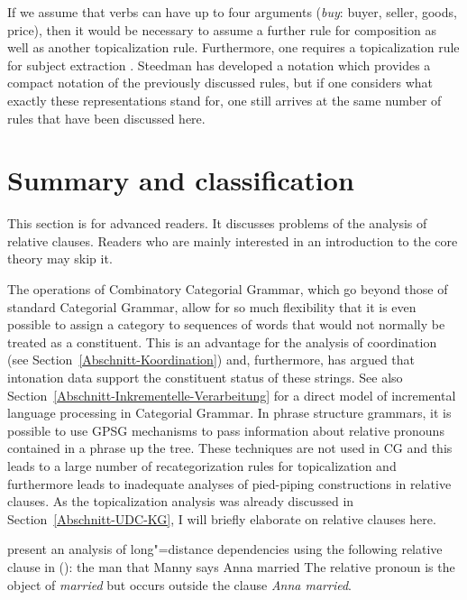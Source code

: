 \noindent
If we assume that verbs can have up to four arguments (\zb \emph{buy}: buyer,
seller, goods, price), then it would be necessary to assume a further rule for composition as well as another topicalization rule.
Furthermore, one requires a topicalization rule for subject extraction \citep[]{Pollard88a}. Steedman has developed a notation which
provides a compact notation of the previously discussed rules, but if one considers what exactly these representations stand for, one still arrives at the
same number of rules that have been discussed here.%

\section{Summary and classification}
\label{Abschnitt-Relativsaetze-CG}\label{Abschnitt-Ratte-CG}\label{sec-pied-piping-cg}

This section is for advanced readers. It discusses problems of the analysis of relative
clauses. Readers who are mainly interested in an introduction to the core theory may skip it.

\largerpage
The operations of Combinatory Categorial Grammar, which go beyond those of standard Categorial Grammar, allow for so much flexibility that it is even possible
to assign a category to sequences of words that would not normally be treated as a constituent. This is an advantage for the analysis of coordination
(see Section~\ref{Abschnitt-Koordination}) and, furthermore, \citet{Steedman91a} has argued that intonation data support the constituent status of these strings.
See also Section~\ref{Abschnitt-Inkrementelle-Verarbeitung} for a direct model of incremental language processing in Categorial Grammar. In phrase structure grammars,
it is possible to use GPSG mechanisms to pass information about relative pronouns contained in a phrase up the tree. These techniques are not used in CG and this leads
to a large number of recategorization rules for topicalization and furthermore leads to inadequate analyses of pied-piping constructions in relative clauses. As the
topicalization analysis was already discussed in Section~\ref{Abschnitt-UDC-KG}, I will briefly elaborate on relative clauses here.

\citet[]{SB2006a-u} present an analysis of long"=distance dependencies using the following relative clause in ():
\ea
the man  that Manny says Anna married
\z
The relative pronoun is the object of \emph{married} but occurs outside the clause \emph{Anna married}.

